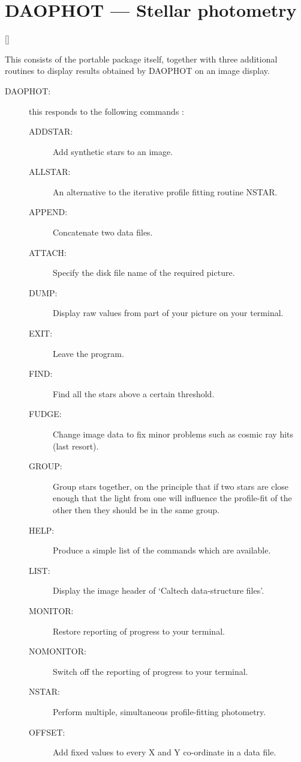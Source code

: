 \newpage

\section{DAOPHOT --- Stellar photometry}

\vspace{-10mm}

\hfill []

\vspace{2mm}

This consists of the portable package itself, together with three additional
routines to display results obtained by DAOPHOT on an image display.
\begin{description}
\item [DAOPHOT:]  this responds to the following commands :
\begin{description}
\item [ADDSTAR:]  Add synthetic stars to an image.
\item [ALLSTAR:]  An alternative to the iterative profile fitting routine NSTAR.
\item [APPEND:]  Concatenate two data files.
\item [ATTACH:]  Specify the disk file name of the required picture.
\item [DUMP:]  Display raw values from part of your picture on your terminal.
\item [EXIT:]  Leave the program.
\item [FIND:]  Find all the stars above a certain threshold.
\item [FUDGE:]  Change image data to fix minor problems such as cosmic ray hits
 (last resort).
\item [GROUP:]  Group stars together, on the principle that if two stars are
 close enough that the light from one will influence the profile-fit of the
 other then they should be in the same group.
\item [HELP:]  Produce a simple list of the commands which are available.
\item [LIST:]  Display the image header of `Caltech data-structure files'.
\item [MONITOR:]  Restore reporting of progress to your terminal.
\item [NOMONITOR:]  Switch off the reporting of progress to your terminal.
\item [NSTAR:]  Perform multiple, simultaneous profile-fitting photometry.
\item [OFFSET:]  Add fixed values to every X and Y co-ordinate in a data file.

\end{description}
\end{description}
